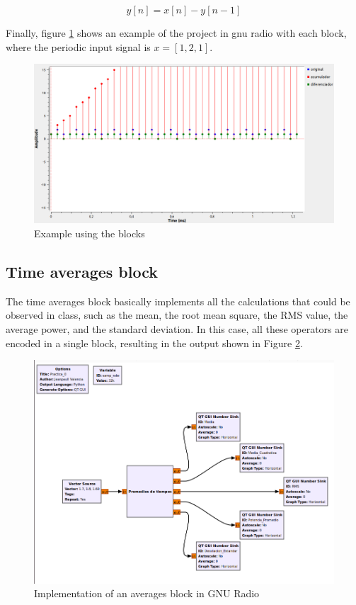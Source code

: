 \documentclass{journal}[IEEEtran, twocolumn]             %
\begin{document}
\begin{multicols}{2}
\begin{equation*}
    y[n] = x[n] - y[n-1]
\end{equation*}

Finally, figure \ref{fig:fig_3} shows an example of the project in gnu radio with each block, where the periodic input signal is $x = [1,2,1]$.

\begin{figure}[H]
        \centering
        \begin{adjustbox}{frame=1pt 1pt,center=1pt}
            \includegraphics[width=1\columnwidth]{figs/ex_acum_diff.png}
        \end{adjustbox}
        \caption{\centering Example using the blocks}
        \label{fig:fig_3}
\end{figure}

\subsection{Time averages block}
The time averages block basically implements all the calculations that could be observed in class, such as the mean, the root mean square, the RMS value, the average power, and the standard deviation. In this case, all these operators are encoded in a single block, resulting in the output shown in Figure \ref{fig:fig_4}.


\begin{figure}[H]
        \centering
        \begin{adjustbox}{frame=1pt 1pt,center=1pt}
            \includegraphics[width=0.8\columnwidth]{figs/time_averages.png}
        \end{adjustbox}
        \caption{\centering Implementation of an averages block in GNU Radio}
        \label{fig:fig_4}
\end{figure}


\end{multicols}
\end{document}
